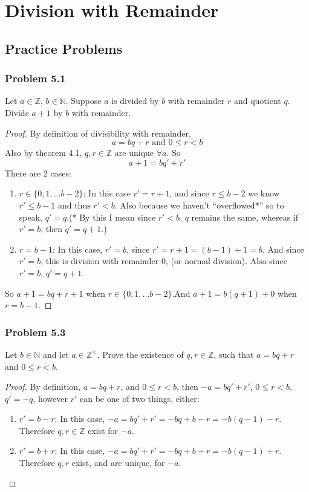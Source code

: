 \documentclass[hidelinks,12pt]{article}
\newcommand{\N}{\mathbb{N}}
\newcommand{\Z}{\mathbb{Z}}
\begin{document}
\section{Division with Remainder}
\subsection{Practice Problems}
\subsubsection{Problem 5.1}
Let $a\in\Z$, $b\in\N$. Suppose $a$ is divided by $b$ with remainder $r$ and quotient $q$. Divide $a+1$ by $b$ with remainder. \begin{proof}
By definition of divisibility with remainder, $$a=bq+r \text{ and } 0\leq r<b$$Also by theorem 4.1, $q,r\in\Z$ are unique $\forall a$. So $$a+1=bq'+r'$$There are 2 cases:\begin{enumerate}
    \item $r\in\{0,1,...b-2\}$: In this case $r'=r+1$, and since $r\leq b-2$ we know $r'\leq b-1\text{ and thus }r'<b$. Also because we haven't ``overflowed*'' so to speak, $q'=q$.\newline(* By this I mean since $r'<b$, $q$ remains the same, whereas if $r'=b$, then $q'=q+1$.)
    \item $r=b-1$: In this case, $r'=b$, since $r'=r+1=(b-1)+1=b$. And since $r'=b$, this is division with remainder 0, (or normal division). Also since $r'=b$, $q'=q+1$.
\end{enumerate}
So $a+1=bq+r+1$ when $r\in\{0,1,...b-2\}$.\newline And $a+1=b(q+1)+0$ when $r=b-1$.
\end{proof}
\subsubsection{Problem 5.3}
Let $b\in\N$ and let $a\in\Z^<$. Prove the existence of $q,r\in\Z$, such that $a=bq+r$ and $0\leq r<b$.
\begin{proof}
By definition, $a=bq+r$, and $0\leq r<b$, then $-a=bq'+r'$, $0\leq r<b$. $q'=-q$, however $r'$ can be one of two things, either:\begin{enumerate}
    \item $r'=b-r$: In this case, $-a=bq'+r'=-bq+b-r=-b(q-1)-r$. Therefore $q,r\in\Z$ exist for $-a$.
    \item $r'=b+r$: In this case, $-a=bq'+r'=-bq+b+r=-b(q-1)+r$. Therefore $q,r$ exist, and are unique, for $-a$.
\end{enumerate}
\end{proof}
\end{document}

